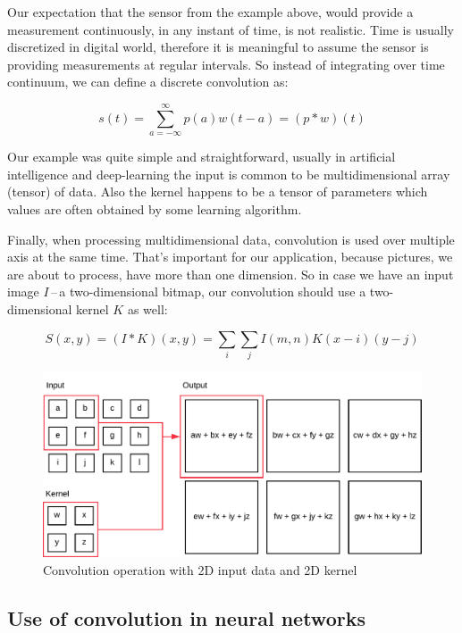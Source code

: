 Our expectation that the sensor from the example above, would provide a measurement continuously, in any instant of time, is not realistic. Time is usually discretized in digital world, therefore it is meaningful to assume the sensor is providing measurements at regular intervals. So instead of integrating over time continuum, we can define a discrete convolution as:

\begin{equation}
    s(t) = \sum_{a=-\infty}^{\infty} p(a) w(t - a) = (p * w)(t)
\end{equation}

Our example was quite simple and straightforward, usually in artificial intelligence and deep-learning the input is common to be multidimensional array (tensor) of data. Also the kernel happens to be a tensor of parameters which values are often obtained by some learning algorithm.

Finally, when processing multidimensional data, convolution is used over multiple axis at the same time. That's important for our application, because pictures, we are about to process, have more than one dimension. So in case we have an input image $I$\,--\,a two-dimensional bitmap, our convolution should use a two-dimensional kernel $K$ as well:

\begin{equation}
    S(x,y) = (I * K)(x, y) = \sum_i\sum_j I(m, n) K(x - i)(y - j)
\end{equation}

\begin{figure}[ht]
    \includegraphics[width=\textwidth]{obrazky-figures/convolution.pdf}
    \caption{Convolution operation with 2D input data and 2D kernel}\label{fig:convolution}
\end{figure}

\subsection{Use of convolution in neural networks}

